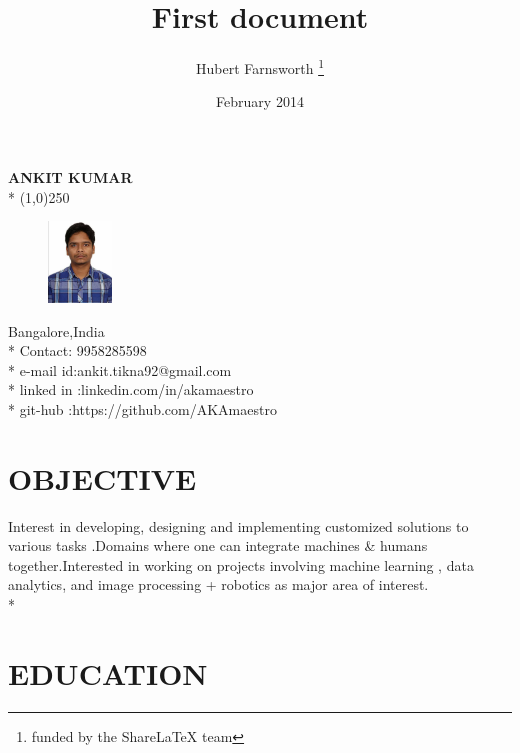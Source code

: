 \documentclass[12pt,a4paper,sans]{article}
\title{First document}
\author{Hubert Farnsworth \thanks{funded by the ShareLaTeX team}}
\date{February 2014}
\begin{document}
 	\begin{center}
 		 	\textbf{ANKIT KUMAR}
 		 	\\*
 			\line(1,0){250}
 		 	 	
 	\end{center}
 
 
 \begin{figure}
	\includegraphics[width=0.15\textwidth]{pic}
 \end{figure}
Bangalore,India
\\*
Contact: 9958285598
\\*
e-mail id:ankit.tikna92@gmail.com
\\*
linked in :linkedin.com/in/akamaestro
\\* git-hub :https://github.com/AKAmaestro
\bigskip
\bigskip\bigskip\bigskip
\section*{OBJECTIVE}
Interest in developing, designing and implementing customized solutions to various tasks .Domains where one can integrate machines & humans together.Interested in working on projects involving machine learning , data analytics, and image processing + robotics as major area of interest.\\*

\section*{EDUCATION}
 
\end{document}
